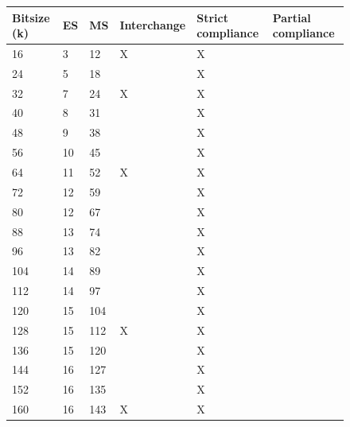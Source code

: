 \begin{figure}[ht]
\begin{center}
    \begin{tabular}{|l|l|l|l|l|l|}
    \hline
    Bitsize (k) & ES & MS  & Interchange & Strict compliance & Partial compliance \\
    \hline
    16          & 3  & 12  & X           & X                 &                    \\
    24          & 5  & 18  &             & X                 &                    \\
    32          & 7  & 24  & X           & X                 &                    \\
    40          & 8  & 31  &             & X                 &                    \\
    48          & 9  & 38  &             & X                 &                    \\
    56          & 10 & 45  &             & X                 &                    \\
    64          & 11 & 52  & X           & X                 &                    \\
    72          & 12 & 59  &             & X                 &                    \\
    80          & 12 & 67  &             & X                 &                    \\
    88          & 13 & 74  &             & X                 &                    \\
    96          & 13 & 82  &             & X                 &                    \\
    104         & 14 & 89  &             & X                 &                    \\
    112         & 14 & 97  &             & X                 &                    \\
    120         & 15 & 104 &             & X                 &                    \\
    128         & 15 & 112 & X           & X                 &                    \\
    136         & 15 & 120 &             & X                 &                    \\
    144         & 16 & 127 &             & X                 &                    \\
    152         & 16 & 135 &             & X                 &                    \\
    160         & 16 & 143 & X           & X                 &                    \\

\end{tabular}
\end{center}
\end{figure}

